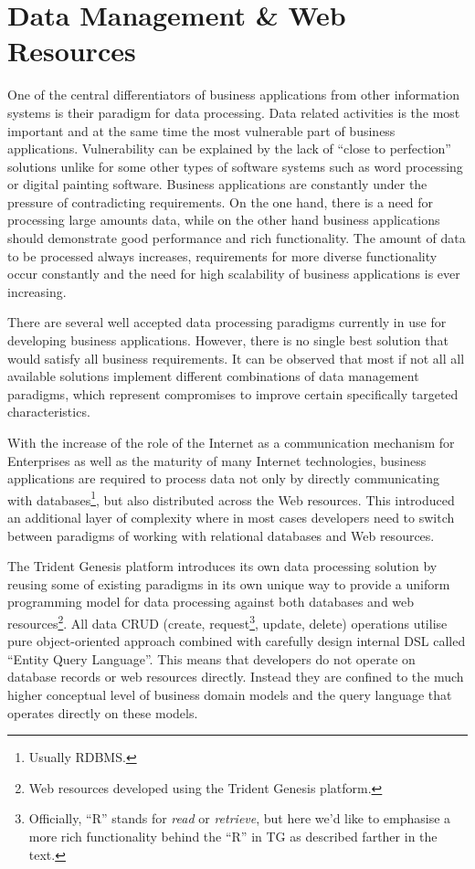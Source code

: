 \section{Data Management \& Web Resources}\label{sec:04}

  One of the central differentiators of business applications from other information systems is their paradigm for data processing.
  Data related activities is the most important and at the same time the most vulnerable part of business applications.
  Vulnerability can be explained by the lack of ``close to perfection'' solutions unlike for some other types of software systems such as word processing or digital painting software.
  Business applications are constantly under the pressure of contradicting requirements.
  On the one hand, there is a need for processing large amounts data, while on the other hand business applications should demonstrate good performance and rich functionality.
  The amount of data to be processed always increases, requirements for more diverse functionality occur constantly and the need for high scalability of business applications is ever increasing.
  
  There are several well accepted data processing paradigms currently in use for developing business applications.
  However, there is no single best solution that would satisfy all business requirements.
  It can be observed that most if not all all available solutions implement different combinations of data management paradigms, which represent compromises to improve certain specifically targeted characteristics.

  With the increase of the role of the Internet as a communication mechanism for Enterprises as well as the maturity of many Internet technologies, business applications are required to process data not only by directly communicating with databases\footnote{Usually RDBMS.}, but also distributed across the Web resources.
  This introduced an additional layer of complexity where in most cases developers need to switch between paradigms of working with relational databases and Web resources.

  The Trident Genesis platform introduces its own data processing solution by reusing some of existing paradigms in its own unique way to provide a uniform programming model for data processing against both databases and web resources\footnote{Web resources developed using the Trident Genesis platform.}.
  All data CRUD (create, request\footnote{Officially, ``R'' stands for \emph{read} or \emph{retrieve}, but here we'd like to emphasise a more rich functionality behind the ``R'' in TG as described farther in the text.}, update, delete) operations utilise pure object-oriented approach combined with carefully design internal DSL called ``Entity Query Language''.
  This means that developers do not operate on database records or web resources directly.
  Instead they are confined to the much higher conceptual level of business domain models and the query language that operates directly on these models.
  
